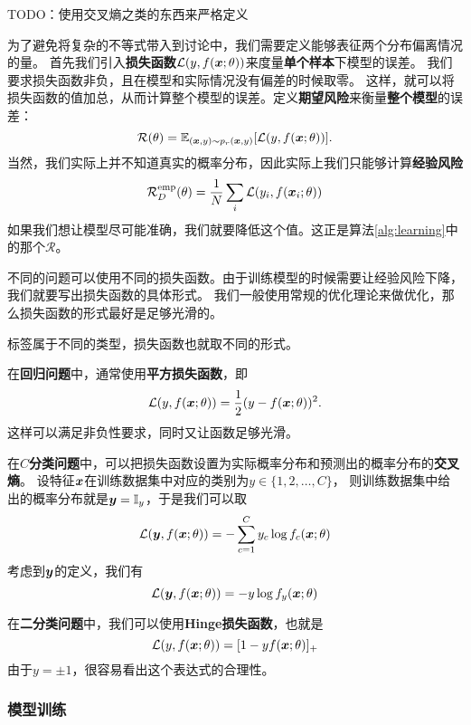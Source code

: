 \documentclass[UTF8, a4paper]{ctexart}
\begin{document}
TODO：使用交叉熵之类的东西来严格定义

为了避免将复杂的不等式带入到讨论中，我们需要定义能够表征两个分布偏离情况的量。
首先我们引入\textbf{损失函数}$\mathcal{L}(y, f(\vb*{x};\theta))$来度量\textbf{单个样本}下模型的误差。
我们要求损失函数非负，且在模型和实际情况没有偏差的时候取零。
这样，就可以将损失函数的值加总，从而计算整个模型的误差。定义\textbf{期望风险}来衡量\textbf{整个模型}的误差：
\begin{equation}
    \mathcal{R}(\theta) = \mathbb{E}_{(\vb*{x}, y) \sim p_r (\vb*{x}, y)}[\mathcal{L}(y, f(\vb*{x};\theta))].
\end{equation}
当然，我们实际上并不知道真实的概率分布，因此实际上我们只能够计算\textbf{经验风险}
\begin{equation}
    \mathcal{R}_D^\text{emp}(\theta) = \frac{1}{N} \sum_i \mathcal{L}(y_i, f(\vb*{x}_i;\theta))
\end{equation}
如果我们想让模型尽可能准确，我们就要降低这个值。这正是算法\ref{alg:learning}中的那个$\mathcal{R}$。

不同的问题可以使用不同的损失函数。由于训练模型的时候需要让经验风险下降，我们就要写出损失函数的具体形式。
我们一般使用常规的优化理论来做优化，那么损失函数的形式最好是足够光滑的。

标签属于不同的类型，损失函数也就取不同的形式。

在\textbf{回归问题}中，通常使用\textbf{平方损失函数}，即 
\begin{equation}
    \mathcal{L}(y, f(\vb*{x};\theta)) = \frac{1}{2} (y-f(\vb*{x};\theta))^2.
\end{equation}
这样可以满足非负性要求，同时又让函数足够光滑。

在$C$\textbf{分类问题}中，可以把损失函数设置为实际概率分布和预测出的概率分布的\textbf{交叉熵}。
设特征$\vb*{x}$在训练数据集中对应的类别为$y\in \{1, 2, \ldots, C\}$，
则训练数据集中给出的概率分布就是$\vb*{y}=\mathbb{I}_y$，于是我们可以取
\[
\mathcal{L}(\vb*{y}, f(\vb*{x};\theta)) = - \sum_{c=1}^C y_c \log f_c(\vb*{x};\theta)
\]
考虑到$\vb*{y}$的定义，我们有
\[
\mathcal{L}(\vb*{y}, f(\vb*{x};\theta)) = - y \log f_y (\vb*{x};\theta)
\]

在\textbf{二分类问题}中，我们可以使用\textbf{Hinge损失函数}，也就是
\[
\mathcal{L}(y, f(\vb*{x};\theta)) = [1-yf(\vb*{x};\theta)]_+
\]
由于$y=\pm 1$，很容易看出这个表达式的合理性。

\subsubsection{模型训练}
\end{document}
